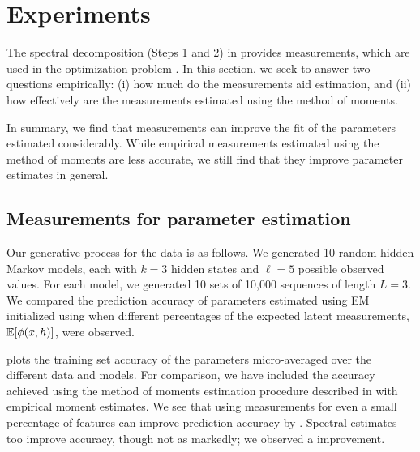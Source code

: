 \section{Experiments} \label{sec:experiments}

The spectral decomposition (Steps 1 and 2) in 
provides measurements,
which are used in the optimization problem .
In this section, we
seek to answer two questions empirically:
(i) how much do the measurements aid estimation, and
(ii) how effectively are the measurements estimated using the
method of moments.

In summary, we find that measurements can improve the fit of the
parameters estimated considerably.
While empirical measurements estimated using the
method of moments are less accurate, we still find that they improve
parameter estimates in general.

\subsection{Measurements for parameter estimation}

Our generative process for the data is as follows.
We generated 10 random hidden Markov models,
each with $k=3$ hidden states and $\ell=5$ possible observed values. 
For each model, we generated 10 sets of 10,000 sequences of length $L=3$.
We compared the prediction accuracy of parameters estimated using EM
initialized using  when different percentages of the expected
latent measurements, $\mathbb{E}[\phi(x,h)]$, were observed.



 plots the training set accuracy of the parameters
micro-averaged over the different data and models.  For comparison, we have
included the accuracy achieved using the method of moments estimation procedure
described in  with empirical moment estimates.  We see
that using measurements for even a small percentage of features can improve
prediction accuracy by . Spectral estimates too improve accuracy,
though not as markedly; we observed a  improvement.

